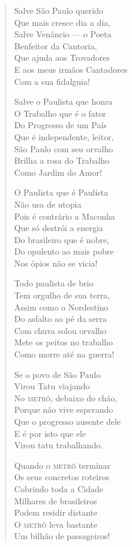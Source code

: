 \begin{verse}
Salve São Paulo querido \\
Que mais cresce dia a dia, \\
Salve Venâncio ---  o Poeta \\
Benfeitor da Cantoria, \\
Que ajuda aos Trovadores \\
E aos meus irmãos Cantadores \\
Com a sua fidalguia! 
\pagebreak

Salve o Paulista que honra \\
O Trabalho que é o fator \\
Do Progresso de um País \\
Que é independente, leitor, \\
São Paulo com seu orvalho \\
Brilha a rosa do Trabalho \\
Como Jardim do Amor! 

O Paulista que é Paulista \\
Não usa de utopia \\
Pois é contrário a Maconha \\
Que só destrói a energia \\
Do brasileiro que é nobre, \\
Do opulento ao mais pobre \\
Nos ópios não se vicia! 

Todo paulista de brio \\
Tem orgulho de sua terra, \\
Assim como o Nordestino \\
Do asfalto ao pé da serra \\
Com chuva solou orvalho \\
Mete os peitos no trabalho \\
Como morre até na guerra! 

Se o povo de São Paulo \\
Virou Tatu viajando \\
No \textsc{metrô}, debaixo do chão, \\
Porque não vive esperando \\
Que o progresso ausente dele \\
E é por isto que ele \\
Virou tatu trabalhando. 
\pagebreak

Quando o \textsc{metrô} terminar \\
Os seus concretos roteiros \\
Cobrindo toda a Cidade \\
Milhares de brasileiros \\
Podem residir distante \\
O \textsc{metrô} leva bastante \\
Um bilhão de passageiros! 


\end{verse}
